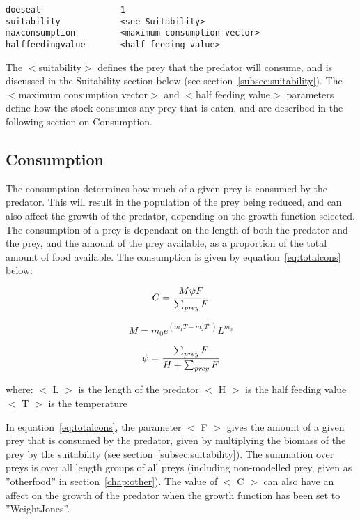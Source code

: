 \documentclass [a4paper, 10pt]{book}
\begin{document}
{\small\begin{verbatim}
doeseat                1
suitability            <see Suitability>
maxconsumption         <maximum consumption vector>
halffeedingvalue       <half feeding value>
\end{verbatim}}

The $<$suitability$>$ defines the prey that the predator will consume, and is discussed in the Suitability section below (see section~\ref{subsec:suitability}).  The $<$maximum consumption vector$>$ and $<$half feeding value$>$ parameters define how the stock consumes any prey that is eaten, and are described in the following section on Consumption.

\subsection{Consumption}\label{subsec:consumption}
The consumption determines how much of a given prey is consumed by the predator.  This will result in the population of the prey being reduced, and can also affect the growth of the predator, depending on the growth function selected.  The consumption of a prey is dependant on the length of both the predator and the prey, and the amount of the prey available, as a proportion of the total amount of food available.  The consumption is given by equation~\ref{eq:totalcons} below:

\begin{equation}\label{eq:totalcons}
C = \frac{M \psi F}{\sum_{\it prey} F}
\end{equation}

\begin{equation}\label{eq:maxcons}
M = m_{0} e^{(m_{1}T - m_{2}T^3)} L^{m_{3}}
\end{equation}

\begin{equation}\label{eq:feedlevel}
\psi = \frac{\sum_{\it prey} F}{H + \sum_{\it prey} F}
\end{equation}

where:\newline
$<$ L $>$ is the length of the predator\newline
$<$ H $>$ is the half feeding value\newline
$<$ T $>$ is the temperature

\bigskip
In equation~\ref{eq:totalcons}, the parameter $<$ F $>$ gives the amount of a given prey that is consumed by the predator, given by multiplying the biomass of the prey by the suitability (see section~\ref{subsec:suitability}).  The summation over preys is over all length groups of all preys (including non-modelled prey, given as ''otherfood'' in section~\ref{chap:other}).  The value of $<$ C $>$ can also have an affect on the growth of the predator when the growth function has been set to ''WeightJones''.
\end{document}
